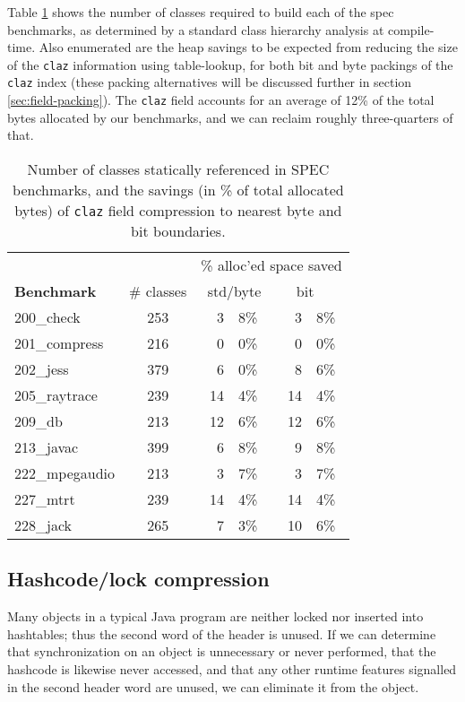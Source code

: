 \documentclass[preprint]{acmconf}
\begin{document}
Table \ref{tab:claz-space} shows the number of classes required to
build each of
the spec benchmarks, as determined by a standard class hierarchy
analysis at compile-time.  Also enumerated are the heap savings to be
expected from reducing the size of the {\tt claz} information using
table-lookup, for both bit and byte packings of the {\tt claz} index
(these packing alternatives will be discussed further in
section \ref{sec:field-packing}).  The {\tt claz} field accounts for an
average of 12\% of the total bytes allocated by our benchmarks, and we
can reclaim roughly three-quarters of that.
\begin{table}
\begin{tabular}{lcr@{.}lr@{.}l}
&& \multicolumn{4}{c}{\% alloc'ed space saved} \\
\bf Benchmark & \# classes & \multicolumn{2}{c}{std/byte} &
                             \multicolumn{2}{l}{~~bit} \\ \hline
200\_check	& 253 &  3&8\% &  3&8\% \\
201\_compress	& 216 &  0&0\% &  0&0\% \\
202\_jess	& 379 &  6&0\% &  8&6\% \\
205\_raytrace	& 239 & 14&4\% & 14&4\% \\
209\_db 	& 213 & 12&6\% & 12&6\% \\
213\_javac	& 399 &  6&8\% &  9&8\% \\
222\_mpegaudio	& 213 &  3&7\% &  3&7\% \\
227\_mtrt	& 239 & 14&4\% & 14&4\% \\
228\_jack	& 265 &  7&3\% & 10&6\% \\
\end{tabular}
\caption{Number of classes statically referenced in SPEC benchmarks,
  and the savings (in \% of total allocated bytes) of {\tt claz} field
  compression to nearest byte and bit boundaries.}
\label{tab:claz-space}
\end{table}

\subsection{Hashcode/lock compression}
Many objects in a typical Java program are neither locked nor inserted
into hashtables; thus the second word of the header is unused.
If we can determine that synchronization on an object is unnecessary
or never performed, that the hashcode is likewise never accessed,
and that any other runtime features signalled in the second header
word are unused, we can eliminate it from the object.
\end{document}
